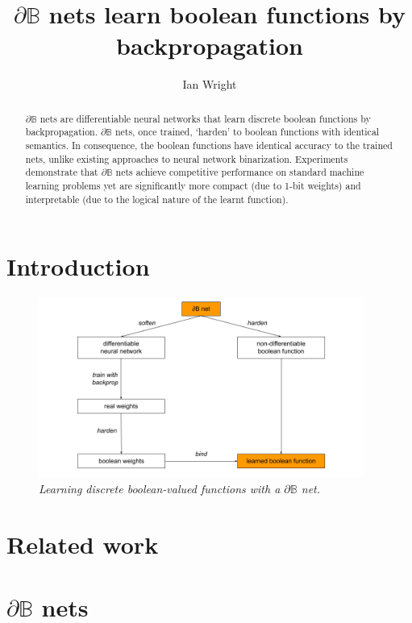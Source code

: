 \documentclass{article} %
\title{$\partial\mathbb{B}$ nets learn boolean functions by\\backpropagation}
\author{Ian Wright}
\begin{document}
\maketitle

\begin{abstract}
	$\partial\mathbb{B}$ nets are differentiable neural networks 
	that learn discrete boolean functions by backpropagation.
	$\partial\mathbb{B}$ nets, once trained, `harden' to boolean functions with identical semantics. In consequence, the boolean functions have identical accuracy to the trained nets, unlike existing approaches to neural network binarization. Experiments demonstrate that $\partial\mathbb{B}$ nets achieve competitive performance on standard machine learning problems yet are significantly more compact (due to 1-bit weights) and interpretable (due to the logical nature of the learnt function).
\end{abstract}

\section{Introduction}

\begin{figure}[h]
	\centering
	\includegraphics[width=0.95\textwidth]{db-net.png}
	\caption{{\em Learning discrete boolean-valued functions with a $\partial\mathbb{B}$ net.}}
	\label{fig:noisy-xor-architecture}
\end{figure}


\section{Related work}

\section{$\partial\mathbb{B}$ nets}
\end{document}
